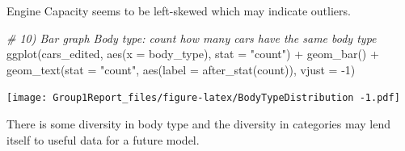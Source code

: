\documentclass[
]{article}
\newenvironment{Shaded}{\begin{snugshade}}{\end{snugshade}}
\newcommand{\AttributeTok}[1]{\textcolor[rgb]{0.77,0.63,0.00}{#1}}
\newcommand{\CommentTok}[1]{\textcolor[rgb]{0.56,0.35,0.01}{\textit{#1}}}
\newcommand{\DecValTok}[1]{\textcolor[rgb]{0.00,0.00,0.81}{#1}}
\newcommand{\FloatTok}[1]{\textcolor[rgb]{0.00,0.00,0.81}{#1}}
\newcommand{\FunctionTok}[1]{\textcolor[rgb]{0.00,0.00,0.00}{#1}}
\newcommand{\NormalTok}[1]{#1}
\newcommand{\OtherTok}[1]{\textcolor[rgb]{0.56,0.35,0.01}{#1}}
\newcommand{\SpecialCharTok}[1]{\textcolor[rgb]{0.00,0.00,0.00}{#1}}
\newcommand{\StringTok}[1]{\textcolor[rgb]{0.31,0.60,0.02}{#1}}
\begin{document}
Engine Capacity seems to be left-skewed which may indicate outliers.

\begin{Shaded}
\begin{Highlighting}[]
\CommentTok{\# 10) Bar graph Body type: count how many cars have the same body type}
\FunctionTok{ggplot}\NormalTok{(cars\_edited, }\FunctionTok{aes}\NormalTok{(}\AttributeTok{x =}\NormalTok{ body\_type), }\AttributeTok{stat =} \StringTok{"count"}\NormalTok{) }\SpecialCharTok{+} \FunctionTok{geom\_bar}\NormalTok{() }\SpecialCharTok{+} \FunctionTok{geom\_text}\NormalTok{(}\AttributeTok{stat =} \StringTok{"count"}\NormalTok{, }\FunctionTok{aes}\NormalTok{(}\AttributeTok{label =} \FunctionTok{after\_stat}\NormalTok{(count)), }\AttributeTok{vjust =} \SpecialCharTok{{-}}\DecValTok{1}\NormalTok{)}
\end{Highlighting}
\end{Shaded}

\texttt{[image: Group1Report\_files/figure-latex/BodyTypeDistribution -1.pdf]}

There is some diversity in body type and the diversity in categories may
lend itself to useful data for a future model.

\begin{Shaded}
\end{Shaded}
\end{document}
